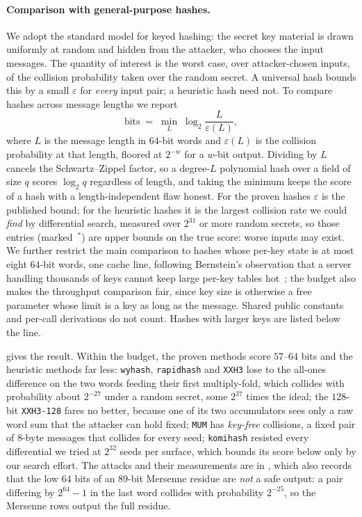 \paragraph{Comparison with general-purpose hashes.}
We adopt the standard model for keyed hashing: the secret key material is drawn
uniformly at random and hidden from the attacker, who chooses the input
messages.  The quantity of interest is the worst case, over attacker-chosen
inputs, of the collision probability taken over the random secret.  A universal
hash bounds this by a small $\varepsilon$ for \emph{every} input pair; a
heuristic hash need not.  To compare hashes across message lengths we report
\[
   \mathrm{bits} \;=\; \min_{L}\;\log_2\frac{L}{\varepsilon(L)},
\]
where $L$ is the message length in $64$-bit words and $\varepsilon(L)$ is the
collision probability at that length, floored at $2^{-w}$ for a $w$-bit output.
Dividing by $L$ cancels the Schwartz--Zippel factor, so a degree-$L$ polynomial
hash over a field of size $q$ scores $\log_2 q$ regardless of length, and
taking the minimum keeps the score of a hash with a length-independent flaw
honest.  For the proven hashes $\varepsilon$ is the published bound; for the
heuristic hashes it is the largest collision rate we could \emph{find} by
differential search, measured over $2^{31}$ or more random secrets, so those
entries (marked~$^*$) are upper bounds on the true score: worse inputs may
exist.  We further restrict the main comparison to hashes whose per-key state
is at most eight $64$-bit words, one cache line, following Bernstein's
observation that a server handling thousands of keys cannot keep large per-key
tables hot~\cite{Bernstein:2011:RW}; the budget also makes the throughput
comparison fair, since key size is otherwise a free parameter whose limit is a
key as long as the message.  Shared public constants and per-call derivations
do not count.  Hashes with larger keys are listed below the line.

 gives the result.  Within the budget, the
proven methods score $57$--$64$ bits and the heuristic methods far less:
\texttt{wyhash}, \texttt{rapidhash} and \texttt{XXH3} lose to the all-ones
difference on the two words feeding their first multiply-fold, which collides
with probability about $2^{-27}$ under a random secret, some $2^{37}$ times the
ideal; the $128$-bit \texttt{XXH3-128} fares no better, because one of its
two accumulators sees only a raw word sum that the attacker can hold fixed; \texttt{MUM} has \emph{key-free} collisions, a fixed pair of $8$-byte
messages that collides for every seed; \texttt{komihash} resisted every
differential we tried at $2^{32}$ seeds per surface, which bounds its score
below only by our search effort.  The attacks and their measurements are in
, which also records that the low $64$ bits of an $89$-bit
Mersenne residue are \emph{not} a safe output: a pair differing by $2^{64}-1$
in the last word collides with probability $2^{-25}$, so the Mersenne rows
output the full residue.

